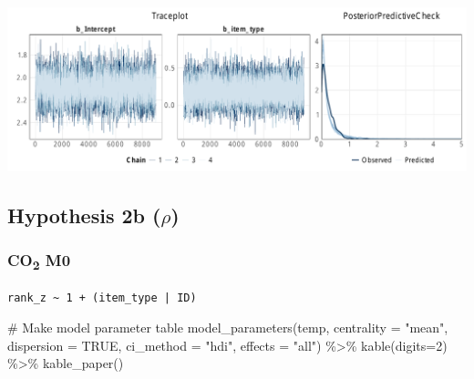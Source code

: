 \documentclass[
  letterpaper,
  DIV=11,
  numbers=noendperiod]{scrartcl}
\newenvironment{Shaded}{\begin{snugshade}}{\end{snugshade}}
\newcommand{\AttributeTok}[1]{\textcolor[rgb]{0.40,0.45,0.13}{#1}}
\newcommand{\CommentTok}[1]{\textcolor[rgb]{0.37,0.37,0.37}{#1}}
\newcommand{\ConstantTok}[1]{\textcolor[rgb]{0.56,0.35,0.01}{#1}}
\newcommand{\DecValTok}[1]{\textcolor[rgb]{0.68,0.00,0.00}{#1}}
\newcommand{\FunctionTok}[1]{\textcolor[rgb]{0.28,0.35,0.67}{#1}}
\newcommand{\NormalTok}[1]{\textcolor[rgb]{0.00,0.23,0.31}{#1}}
\newcommand{\OtherTok}[1]{\textcolor[rgb]{0.00,0.23,0.31}{#1}}
\newcommand{\SpecialCharTok}[1]{\textcolor[rgb]{0.37,0.37,0.37}{#1}}
\newcommand{\StringTok}[1]{\textcolor[rgb]{0.13,0.47,0.30}{#1}}
\begin{document}
\includegraphics{supplement_files/figure-pdf/h2aM1kcal-1.pdf}

\subsection{\texorpdfstring{Hypothesis 2b
(\(\rho\))}{Hypothesis 2b (\textbackslash rho)}}\label{hypothesis-2b-rho}

\subsubsection{\texorpdfstring{CO\textsubscript{2}
M0}{CO2 M0}}\label{co2-m0-3}

\begin{Shaded}
\end{Shaded}

\begin{verbatim}
rank_z ~ 1 + (item_type | ID) 
\end{verbatim}

\begin{Shaded}
\begin{Highlighting}[]
\CommentTok{\# Make model parameter table}
\FunctionTok{model\_parameters}\NormalTok{(temp, }\AttributeTok{centrality =} \StringTok{"mean"}\NormalTok{, }\AttributeTok{dispersion =} \ConstantTok{TRUE}\NormalTok{, }
                 \AttributeTok{ci\_method =} \StringTok{"hdi"}\NormalTok{, }\AttributeTok{effects =} \StringTok{"all"}\NormalTok{) }\SpecialCharTok{\%\textgreater{}\%} 
  \FunctionTok{kable}\NormalTok{(}\AttributeTok{digits=}\DecValTok{2}\NormalTok{) }\SpecialCharTok{\%\textgreater{}\%} \FunctionTok{kable\_paper}\NormalTok{()}
\end{Highlighting}
\end{Shaded}
\end{document}
